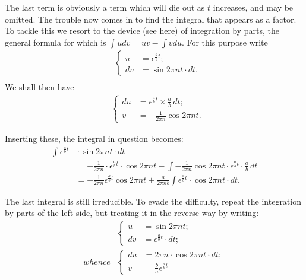 \documentclass{ximera}
\begin{document}
The last term is obviously a term which will die
out as $t$ increases, and may be omitted. The trouble
now comes in to find the integral that appears as a
factor. To tackle this we resort to the device (see
here) of integration by parts, the general formula for
which is $\int u dv = uv - \int v du$. For this purpose write
\begin{align*}
&\left\{
\begin{aligned}
 u &= \epsilon^{\frac{a}{b} t}; \\
dv &= \sin 2\pi nt · dt.
\end{aligned}
\right.  \\
\end{align*}
We shall then have
\begin{align*}
&\left\{
\begin{aligned}
du &= \epsilon^{\frac{a}{b} t} \times \frac{a}{b}\, dt; \\
v &= - \frac{1}{2\pi n} \cos 2\pi nt.
\end{aligned}
\right.
\end{align*}


Inserting these, the integral in question becomes:
\begin{align*}
\int \epsilon^{\frac{a}{b} t} &{} · \sin 2 \pi n t · dt \\
&= -\frac{1}{2 \pi n} · \epsilon^{\frac{a}{b} t} · \cos 2 \pi nt
   -\int -\frac{1}{2\pi n} \cos 2 \pi nt · \epsilon^{\frac{a}{b} t} · \frac{a}{b}\, dt \\
&= -\frac{1}{2 \pi n} \epsilon^{\frac{a}{b} t} \cos 2 \pi nt
   +\frac{a}{2 \pi nb} \int \epsilon^{\frac{a}{b} t} · \cos 2 \pi nt · dt.
\tag*{[B]}
\end{align*}

The last integral is still irreducible. To evade the
difficulty, repeat the integration by parts of the left
side, but treating it in the reverse way by writing:
\begin{align*}
&\left\{
\begin{aligned}
u &= \sin 2 \pi n t ; \\
dv &= \epsilon^{\frac{a}{b} t} · dt;
\end{aligned}
\right. \\[1ex]
 whence
&\left\{
  \begin{aligned}
  du &= 2 \pi n · \cos 2 \pi n t · dt; \\
 v &= \frac{b}{a} \epsilon ^{\frac{a}{b} t}
\end{aligned}
\right.
\end{align*}
\end{document}
